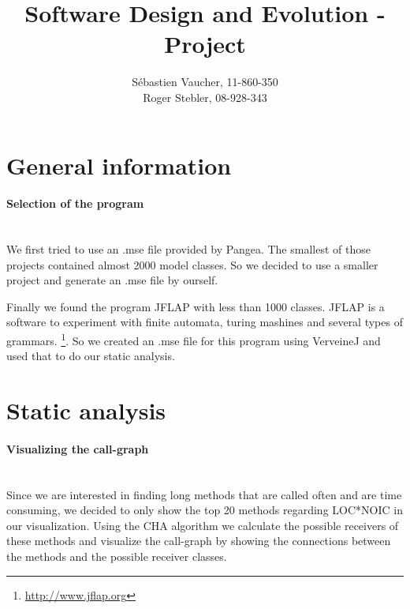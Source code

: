 \documentclass{paper}
\title{Software Design and Evolution - Project}
\author{S\'{e}bastien Vaucher, 11-860-350\\Roger Stebler, 08-928-343}
\begin{document}
\maketitle


%

\section{General information}

\paragraph{Selection of the program}\mbox{}\vspace{10pt}\\
We first tried to use an .mse file provided by Pangea. The smallest of those projects contained almost 2000 model classes. So we decided to use a smaller project and generate an .mse file by ourself.


Finally we found the program JFLAP with less than 1000 classes. JFLAP is a software to experiment with finite automata, turing mashines and several types of grammars. \footnote{\url{http://www.jflap.org}}. So we created an .mse file for this program using VerveineJ and used that to do our static analysis.


\section{Static analysis}

\paragraph{Visualizing the call-graph}\mbox{}\vspace{10pt}\\
Since we are interested in finding long methods that are called often and are time consuming, we decided to only show the top 20 methods regarding LOC*NOIC in our visualization. Using the CHA algorithm we calculate the possible receivers of these methods and visualize the call-graph by showing the connections between the methods and the possible receiver classes.
\end{document}
